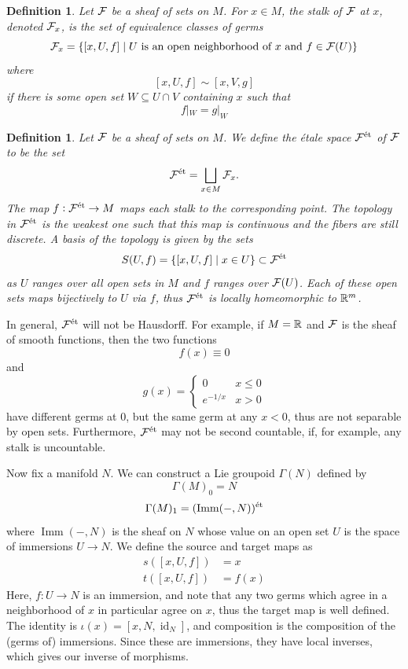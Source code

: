 \documentclass{article}
\newtheorem{definition}[theorem]{Definition}
\newtheorem{proposed work}[theorem]{Proposed Work}
\theoremstyle{definition}
\DeclareMathOperator{\Imm}{Imm}
\DeclareMathOperator{\id}{id}
\newcommand{\Fet}{\cF^{\text{\'et}}}
\begin{document}
\begin{definition}
  Let $\mathcal F$ be a sheaf of sets on $M$. For $x\in M$, the \emph{stalk} of $\mathcal F$ at $x$, denoted $\mathcal F_x$, is the set of equivalence classes of germs
  \[
    \mathcal F_x = \{[x, U, f] \mid U\text{ is an open neighborhood of }x\text{ and }f\in \mathcal F(U)\}
  \]
  where
\[  [x, U, f]\sim [x, V, g]
\]
  if there is some open set $W\subseteq U\cap V$ containing $x$ such that
  \[
    f|_W = g|_W
\]
\end{definition}
\begin{definition}
  Let $\mathcal F$ be a sheaf of sets on $M$. We define the \emph{\'etale space} $\Fet$ of $\mathcal F$ to be the set
  \[
    \Fet = \bigsqcup_{x\in M}\cF_x.
  \]
  The map $f: \Fet\to M$ maps each stalk to the corresponding point. The topology in $\Fet$ is the weakest one such that this map is continuous and the fibers are still discrete. A basis of the topology is given by the sets
  \[
    S(U,f)=\{[x,U,f] \mid x\in U\}\subset \Fet
  \]
  as $U$ ranges over all open sets in $M$ and $f$ ranges over $\mathcal F(U)$. Each of these open sets maps bijectively to $U$ via $f$, thus $\Fet$ is locally homeomorphic to $\mathbb R^m$.
\end{definition}
In general, $\Fet$ will not be Hausdorff. For example, if $M=\mathbb R$ and $\mathcal F$ is the sheaf of smooth functions, then the two functions
\[
  f(x)\equiv 0
\]
and
\[
  g(x)=
  \begin{cases}
    0 & x\le 0\\
    e^{-1/x}&x> 0
  \end{cases}
\]
have different germs at 0, but the same germ at any $x<0$, thus are not separable by open sets. Furthermore, $\Fet$ may not be second countable, if, for example, any stalk is uncountable.

Now fix a manifold $N$. We can construct a Lie groupoid $\Gamma(N)$ defined by
\[
  \Gamma(M)_0 = N
\]
\[
\Gamma(M)_1 = (\Imm(-,N))^\text{\'et}\\
\]
where $\Imm(-,N)$ is the sheaf on $N$ whose value on an open set $U$ is the space of immersions $U\to N$. We define the source and target maps as
\begin{align*}
  s([x,U,f]) &= x\\
  t([x,U,f]) &= f(x)
\end{align*}
Here, $f:U\to N$ is an immersion, and note that any two germs which agree in a neighborhood of $x$ in particular agree on $x$, thus the target map is well defined. The identity is $\iota(x)=[x,N,\id_N]$, and composition is the composition of the (germs of) immersions. Since these are immersions, they have local inverses, which gives our inverse of morphisms.
\end{document}
